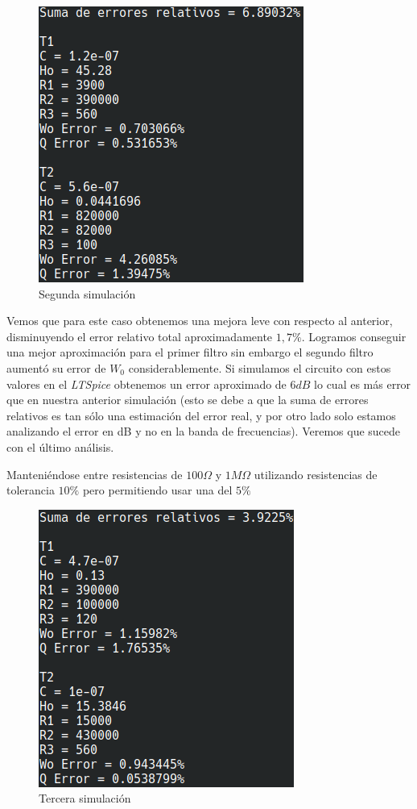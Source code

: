 \documentclass[11pt,a4paper]{report}
\begin{document}
\begin{list}{•}
\begin{figure}[h!]
\centering
\includegraphics[scale=1]{ResultadosSegundoCaso.png}
\caption{Segunda simulación}
\end{figure}

Vemos que para este caso obtenemos una mejora leve con respecto al anterior, disminuyendo el error relativo total aproximadamente $1,7\%$. Logramos conseguir una mejor aproximación para el primer filtro sin embargo el segundo filtro aumentó su error de $W_{0}$ considerablemente. Si simulamos el circuito con estos valores en el
\textit{LTSpice} obtenemos un error aproximado de $6dB$ lo cual es más error que en nuestra anterior simulación (esto se debe a que la suma de errores relativos es tan sólo una estimación del error real, y por otro lado solo estamos analizando el error en dB y no en la banda de frecuencias). Veremos que sucede con el último análisis.

\newpage
\item Manteniéndose entre resistencias de $100\Omega$ y $1M\Omega$ utilizando resistencias de tolerancia $10\%$ pero permitiendo usar una del $5\%$

\vspace{10 mm}

\begin{figure}[h!]
\centering
\includegraphics[scale=1]{ResultadosTercerCaso.png}
\caption{Tercera simulación}
\end{figure}


\end{list}
\end{document}

